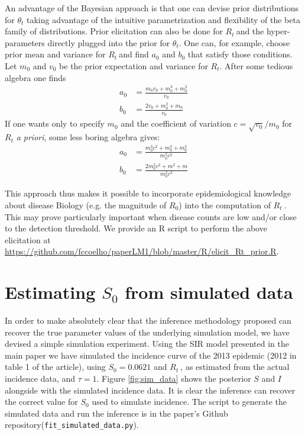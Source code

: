 \documentclass[a4paper,10pt]{article}
\def \rr {$R_{t}\:$}
\begin{document}
An advantage of the Bayesian approach is that one can devise prior 
distributions for $\theta_t$ taking advantage of the intuitive parametrization 
and flexibility of the beta family of distributions.
Prior elicitation can also be done for \rr and the hyper-parameters directly 
plugged into the prior for $\theta_t$. 
One can, for example, choose prior mean and variance for \rr and find $a_0$ 
and $b_0$ that satisfy those conditions.
Let $m_0$ and $v_0$ be the prior expectation and variance for $R_t$. 
After some tedious algebra one finds
\begin{align}
\label{seq:elicitation}
a_0 &= \frac{m_0v_0 + m_0^3 + m_0^2}{v_0} \\
b_0 &= \frac{2v_0 + m_0^2 + m_0}{v_0}
\end{align}
If one wants only to specify $m_0$ and the coefficient of variation $c = 
\sqrt{v_0}/ m_0$ for $R_t$ \textit{a priori}, some less boring 
algebra gives:
\begin{align}
\label{seq:elicitationcv}
a_0 &= \frac{m_0^3c^2 + m_0^3 + m_0^2}{m_0^2c^2} \\
b_0 &= \frac{2m_0^2c^2 + m^2 + m}{m_0^2c^2}
\end{align}

This approach thus makes it possible to incorporate epidemiological knowledge 
about disease Biology (e.g. the magnitude of $R_0$) into the computation of \rr.
This may prove particularly important when disease counts are low and/or close 
to the detection threshold.
We provide an R script to perform the above elicitation at 
\url{https://github.com/fccoelho/paperLM1/blob/master/R/elicit_Rt_prior.R}.

\section*{Estimating $S_0$ from simulated data}
In order to make absolutely clear that the inference methodology proposed can 
recover the true parameter values of the underlying simulation model, we have 
devised a simple simulation experiment. Using the SIR model presented in the 
main paper we have simulated the incidence curve of the  2013 epidemic (2012 in 
table 1 of the article), using $S_0 = 0.0621$ and \rr, as estimated from the 
actual incidence data, and $\tau=1$. Figure \ref{fig:sim_data} shows the 
posterior $S$ and $I$ alongside with the simulated incidence data. It is clear 
the inference can recover the correct value for $S_0$ used to   simulate 
incidence. The script to generate the simulated data and run the inference is in 
the paper's Github repository(\verb|fit_simulated_data.py|).
\end{document}
